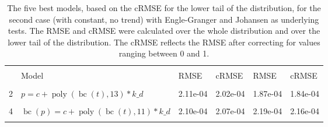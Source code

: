 \documentclass[12pt,a4paper]{article}
\DeclareMathOperator{\bc}{bc}
\DeclareMathOperator{\poly}{poly}
\begin{document}
\begin{table}[!h]

\caption{\label{tab:5_best_e_j_2}\label{tab:best_e_j_2} The five best models, based on the cRMSE for the lower tail of the distribution, for the second case (with constant, no trend) with Engle-Granger and Johansen as underlying tests. The RMSE and cRMSE were calculated over the whole distribution and over the lower tail of the distribution. The cRMSE reflects the RMSE after correcting for values ranging between 0 and 1.}
\centering
\fontsize{10}{12}\selectfont
\begin{tabular}[t]{ll>{\raggedleft\arraybackslash}p{2cm}>{\raggedleft\arraybackslash}p{2cm}>{\raggedleft\arraybackslash}p{2cm}>{\raggedleft\arraybackslash}p{2cm}}
\toprule
\multicolumn{1}{c}{\textbf{}} & \multicolumn{1}{c}{\textbf{}} & \multicolumn{2}{c}{\textbf{Full Distribution}} & \multicolumn{2}{c}{\textbf{Lower Tail ($p \leq 0.2$)}} \\
\cmidrule(l{3pt}r{3pt}){3-4} \cmidrule(l{3pt}r{3pt}){5-6}
  & Model & RMSE & cRMSE & RMSE & cRMSE\\
\midrule
\cellcolor{gray!6}{1} & \cellcolor{gray!6}{$\bc(p) = c + \poly\left( \bc(t), 13 \right) * k\_d$} & \cellcolor{gray!6}{1.57e-04} & \cellcolor{gray!6}{1.56e-04} & \cellcolor{gray!6}{1.64e-04} & \cellcolor{gray!6}{1.63e-04}\\
2 & $p = c + \poly\left( \bc(t), 13 \right) * k\_d$ & 2.11e-04 & 2.02e-04 & 1.87e-04 & 1.84e-04\\
\cellcolor{gray!6}{3} & \cellcolor{gray!6}{$\log(p) = c + \poly\left( \bc(t), 12 \right) * k\_d$} & \cellcolor{gray!6}{2.10e-04} & \cellcolor{gray!6}{2.00e-04} & \cellcolor{gray!6}{2.27e-04} & \cellcolor{gray!6}{2.16e-04}\\
4 & $\bc(p) = c + \poly\left( \bc(t), 11 \right) * k\_d$ & 2.10e-04 & 2.07e-04 & 2.19e-04 & 2.16e-04\\
\cellcolor{gray!6}{5} & \cellcolor{gray!6}{$\bc(p) = c + \poly\left( \bc(t), 12 \right) * k\_d$} & \cellcolor{gray!6}{2.11e-04} & \cellcolor{gray!6}{2.04e-04} & \cellcolor{gray!6}{2.25e-04} & \cellcolor{gray!6}{2.17e-04}\\
\bottomrule
\end{tabular}
\end{table}
\end{document}

